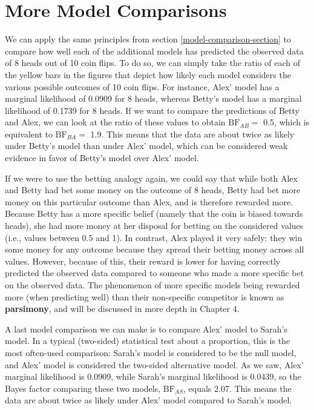 \documentclass[
]{book}
\begin{document}
\hypertarget{more-model-comparison-section}{%
\section{More Model Comparisons}\label{more-model-comparison-section}}

We can apply the same principles from section \ref{model-comparison-section} to compare how well each of the additional models has predicted the observed data of 8 heads out of 10 coin flips. To do so, we can simply take the ratio of each of the yellow bars in the figures that depict how likely each model considers the various possible outcomes of 10 coin flips. For instance, Alex' model has a marginal likelihood of 0.0909 for 8 heads, whereas Betty's model has a marginal likelihood of 0.1739 for 8 heads. If we want to compare the predictions of Betty and Alex, we can look at the ratio of these values to obtain \(\text{BF}_{AB} =\) 0.5, which is equivalent to \(\text{BF}_{BA} =\) 1.9. This means that the data are about twice as likely under Betty's model than under Alex' model, which can be considered weak evidence in favor of Betty's model over Alex' model.

If we were to use the betting analogy again, we could say that while both Alex and Betty had bet some money on the outcome of 8 heads, Betty had bet more money on this particular outcome than Alex, and is therefore rewarded more. Because Betty has a more specific belief (namely that the coin is biased towards heads), she had more money at her disposal for betting on the considered values (i.e., values between 0.5 and 1). In contrast, Alex played it very safely: they win some money for any outcome because they spread their betting money across all values. However, because of this, their reward is lower for having correctly predicted the observed data compared to someone who made a more specific bet on the observed data. The phenomenon of more specific models being rewarded more (when predicting well) than their non-specific competitor is known as \textbf{parsimony}, and will be discussed in more depth in Chapter 4.

A last model comparison we can make is to compare Alex' model to Sarah's model. In a typical (two-sided) statistical test about a proportion, this is the most often-used comparison: Sarah's model is considered to be the null model, and Alex' model is considered the two-sided alternative model. As we saw, Alex' marginal likelihood is 0.0909, while Sarah's marginal likelihood is 0.0439, so the Bayes factor comparing these two models, \(\text{BF}_{AS}\), equals 2.07. This means the data are about twice as likely under Alex' model compared to Sarah's model.
\end{document}
